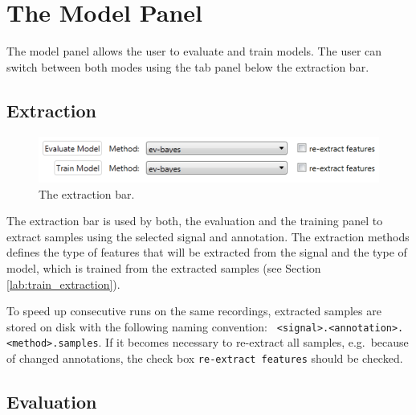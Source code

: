 \chapter{The Model Panel}\label{lab:train}

The model panel allows the user to evaluate and train models. The user can switch between both modes using the tab panel below the extraction bar.

\section{Extraction}\label{lab:train_extract_overview}

\begin{figure}[h]
\begin{center}
\includegraphics[scale=0.5]{pics/train_gui_extract.png}
\end{center}
\vspace{-0.5cm}
\caption{The extraction bar.}
\label{fig:extract_gui}
\end{figure}

The extraction bar is used by both, the evaluation and the training panel to extract samples using the selected signal and annotation. The extraction methods defines the type of features that will be extracted from the signal and the type of model, which is trained from the extracted samples (see Section \ref{lab:train_extraction}).

To speed up consecutive runs on the same recordings, extracted samples are stored on disk with the following naming convention: \texttt{ <signal>.<annotation>.<method>.samples}. If it becomes necessary to re-extract all samples, e.g.\ because of changed annotations, the check box \texttt{re-extract features} should be checked.

\section{Evaluation}\label{lab:train_eval_overview}

